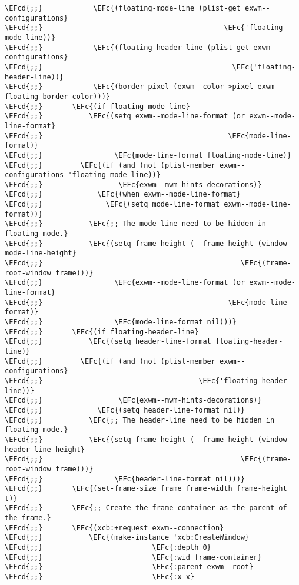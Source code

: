 \documentclass[a4wide,10pt]{article}
\newcommand{\EFc}[1]{\textcolor{EFc}{#1}} %
\newcommand{\EFcd}[1]{\textcolor{EFcd}{#1}} %
\begin{document}
\begin{Code}
\begin{Verbatim}
\EFcd{;;}            \EFc{(floating-mode-line (plist-get exwm--configurations}
\EFcd{;;}                                           \EFc{'floating-mode-line))}
\EFcd{;;}            \EFc{(floating-header-line (plist-get exwm--configurations}
\EFcd{;;}                                             \EFc{'floating-header-line))}
\EFcd{;;}            \EFc{(border-pixel (exwm--color->pixel exwm-floating-border-color)))}
\EFcd{;;}       \EFc{(if floating-mode-line}
\EFcd{;;}           \EFc{(setq exwm--mode-line-format (or exwm--mode-line-format}
\EFcd{;;}                                            \EFc{mode-line-format)}
\EFcd{;;}                 \EFc{mode-line-format floating-mode-line)}
\EFcd{;;}         \EFc{(if (and (not (plist-member exwm--configurations 'floating-mode-line))}
\EFcd{;;}                  \EFc{exwm--mwm-hints-decorations)}
\EFcd{;;}             \EFc{(when exwm--mode-line-format}
\EFcd{;;}               \EFc{(setq mode-line-format exwm--mode-line-format))}
\EFcd{;;}           \EFc{;; The mode-line need to be hidden in floating mode.}
\EFcd{;;}           \EFc{(setq frame-height (- frame-height (window-mode-line-height}
\EFcd{;;}                                               \EFc{(frame-root-window frame)))}
\EFcd{;;}                 \EFc{exwm--mode-line-format (or exwm--mode-line-format}
\EFcd{;;}                                            \EFc{mode-line-format)}
\EFcd{;;}                 \EFc{mode-line-format nil)))}
\EFcd{;;}       \EFc{(if floating-header-line}
\EFcd{;;}           \EFc{(setq header-line-format floating-header-line)}
\EFcd{;;}         \EFc{(if (and (not (plist-member exwm--configurations}
\EFcd{;;}                                     \EFc{'floating-header-line))}
\EFcd{;;}                  \EFc{exwm--mwm-hints-decorations)}
\EFcd{;;}             \EFc{(setq header-line-format nil)}
\EFcd{;;}           \EFc{;; The header-line need to be hidden in floating mode.}
\EFcd{;;}           \EFc{(setq frame-height (- frame-height (window-header-line-height}
\EFcd{;;}                                               \EFc{(frame-root-window frame)))}
\EFcd{;;}                 \EFc{header-line-format nil)))}
\EFcd{;;}       \EFc{(set-frame-size frame frame-width frame-height t)}
\EFcd{;;}       \EFc{;; Create the frame container as the parent of the frame.}
\EFcd{;;}       \EFc{(xcb:+request exwm--connection}
\EFcd{;;}           \EFc{(make-instance 'xcb:CreateWindow}
\EFcd{;;}                          \EFc{:depth 0}
\EFcd{;;}                          \EFc{:wid frame-container}
\EFcd{;;}                          \EFc{:parent exwm--root}
\EFcd{;;}                          \EFc{:x x}

\end{Verbatim}
\end{Code}
\end{document}
